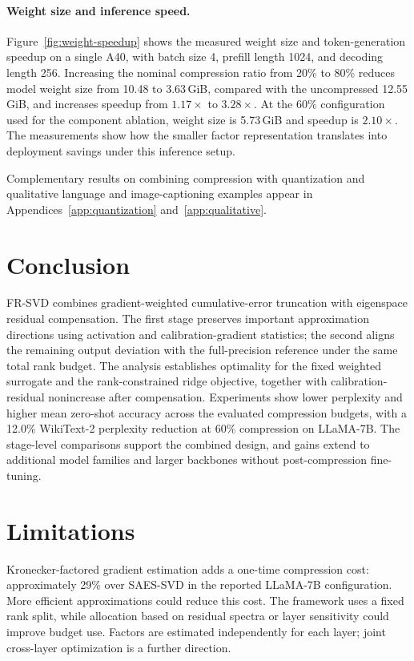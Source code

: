 \documentclass[11pt]{article}
\begin{document}
\paragraph{Weight size and inference speed.}
Figure~\ref{fig:weight-speedup} shows the measured weight size and token-generation speedup on a single A40, with batch size 4, prefill length 1024, and decoding length 256. Increasing the nominal compression ratio from 20\% to 80\% reduces model weight size from 10.48 to 3.63\,GiB, compared with the uncompressed 12.55\,GiB, and increases speedup from $1.17\times$ to $3.28\times$. At the 60\% configuration used for the component ablation, weight size is 5.73\,GiB and speedup is $2.10\times$. The measurements show how the smaller factor representation translates into deployment savings under this inference setup.



Complementary results on combining compression with quantization and qualitative language and image-captioning examples appear in Appendices~\ref{app:quantization} and~\ref{app:qualitative}.

\section{Conclusion}\label{sec:conclusion}

FR-SVD combines gradient-weighted cumulative-error truncation with eigenspace residual compensation. The first stage preserves important approximation directions using activation and calibration-gradient statistics; the second aligns the remaining output deviation with the full-precision reference under the same total rank budget. The analysis establishes optimality for the fixed weighted surrogate and the rank-constrained ridge objective, together with calibration-residual nonincrease after compensation. Experiments show lower perplexity and higher mean zero-shot accuracy across the evaluated compression budgets, with a 12.0\% WikiText-2 perplexity reduction at 60\% compression on LLaMA-7B. The stage-level comparisons support the combined design, and gains extend to additional model families and larger backbones without post-compression fine-tuning.
\FloatBarrier
\label{main:end}

\section*{Limitations}

Kronecker-factored gradient estimation adds a one-time compression cost: approximately 29\% over SAES-SVD in the reported LLaMA-7B configuration. More efficient approximations could reduce this cost. The framework uses a fixed rank split, while allocation based on residual spectra or layer sensitivity could improve budget use. Factors are estimated independently for each layer; joint cross-layer optimization is a further direction.
\end{document}
